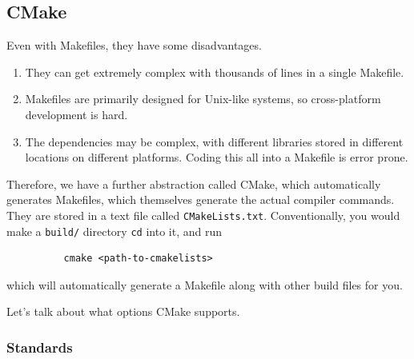 \documentclass{article}
\newcounter{definition}[section]
\begin{document}
  \subsection{CMake}

      Even with Makefiles, they have some disadvantages. 
      \begin{enumerate}
        \item They can get extremely complex with thousands of lines in a single Makefile. 
        \item Makefiles are primarily designed for Unix-like systems, so cross-platform development is hard. 
        \item The dependencies may be complex, with different libraries stored in different locations on different platforms. Coding this all into a Makefile is error prone. 
      \end{enumerate}

      \begin{definition}[CMake]
        \label{def:cmake}
        Therefore, we have a further abstraction called CMake, which automatically generates Makefiles, which themselves generate the actual compiler commands. They are stored in a text file called \texttt{CMakeLists.txt}. Conventionally, you would make a \texttt{build/} directory \texttt{cd} into it, and run 
        \begin{lstlisting}
          cmake <path-to-cmakelists> 
        \end{lstlisting} 
        which will automatically generate a Makefile along with other build files for you. 
      \end{definition} 

      Let's talk about what options CMake supports. 

    \subsubsection{Standards}
\end{document}
